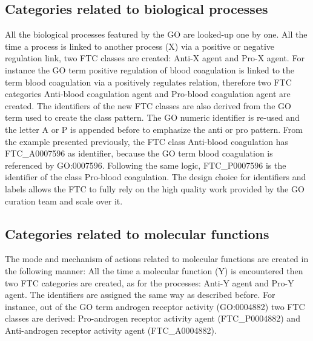 \documentclass{bioinfo}
\begin{document}
\subsection{Categories related to biological processes}
All the biological processes featured by the GO are looked-up one by one. All the 
time a process is linked to another process (X) via a positive or negative regulation link, two FTC 
classes are created: Anti-X agent and Pro-X agent. For instance the GO term positive regulation of blood 
coagulation is linked to the term blood coagulation via a positively regulates relation, therefore two FTC 
categories Anti-blood coagulation agent and Pro-blood coagulation agent are created. The identifiers of the 
new FTC classes are also derived from the GO term used to create the class pattern. The GO numeric identifier 
is re-used and the letter A or P is appended before to emphasize the anti or pro pattern. From the example presented 
previously, the FTC class Anti-blood coagulation has FTC\_A0007596 as identifier, because the GO term blood coagulation is 
referenced by GO:0007596. Following the same logic, FTC\_P0007596 is the identifier of the class Pro-blood coagulation. The 
design choice for identifiers and labels allows the FTC to fully rely on the high quality work provided by the GO curation 
team and scale over it.

\subsection{Categories related to molecular functions}
The mode and mechanism of actions related to molecular functions are created in the following manner: All the time 
a molecular function (Y) is encountered then two FTC categories are created, as for the processes: Anti-Y agent and 
Pro-Y agent. The identifiers are assigned the same way as described before. For instance, out of the GO term androgen 
receptor activity (GO:0004882) two FTC classes are derived: Pro-androgen receptor activity agent (FTC\_P0004882) and 
Anti-androgen receptor activity agent (FTC\_A0004882).
\end{document}
